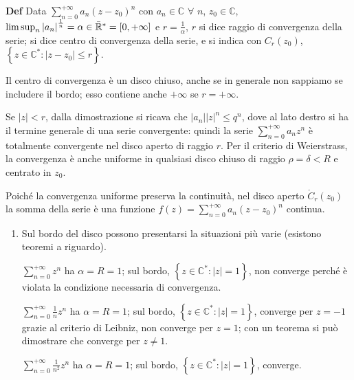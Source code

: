 \documentclass{article}
\begin{document}
\textbf{Def} Data $\sum_{n=0}^{+\infty }a_{n}\left( z-z_{0}\right) ^{n}$ con 
$a_{n}\in 
\mathbb{C}
$ $\forall $ $n$, $z_{0}\in 
\mathbb{C}
$, $\lim \sup_{n}\left\vert a_{n}\right\vert ^{\frac{1}{n}}=\alpha \in \bar{%
\mathbb{R}%
}^{\ast }=\left[ 0,+\infty \right] $ e $r=\frac{1}{\alpha }$, $r$ si dice
raggio di convergenza della serie; si dice centro di convergenza della
serie, e si indica con $C_{r}\left( z_{0}\right) $, $\left\{ z\in 
\mathbb{C}
^{\ast }:\left\vert z-z_{0}\right\vert \leq r\right\} $.

Il centro di convergenza \`{e} un disco chiuso, anche se in generale non
sappiamo se includere il bordo; esso contiene anche $+\infty $ se $r=+\infty 
$.

Se $\left\vert z\right\vert <r$, dalla dimostrazione si ricava che $%
\left\vert a_{n}\right\vert \left\vert z\right\vert ^{n}\leq q^{n}$, dove al
lato destro si ha il termine generale di una serie convergente: quindi la
serie $\sum_{n=0}^{+\infty }a_{n}z^{n}$ \`{e} totalmente convergente nel
disco aperto di raggio $r$. Per il criterio di Weierstrass, la convergenza 
\`{e} anche uniforme in qualsiasi disco chiuso di raggio $\rho =\delta <R$ e
centrato in $z_{0}$.

Poich\'{e} la convergenza uniforme preserva la continuit\`{a}, nel disco
aperto $\mathring{C}_{r}\left( z_{0}\right) $ la somma della serie \`{e} una
funzione $f\left( z\right) =\sum_{n=0}^{+\infty }a_{n}\left( z-z_{0}\right)
^{n}$ continua.

\begin{enumerate}
\item Sul bordo del disco possono presentarsi la situazioni pi\`{u} varie
(esistono teoremi a riguardo).

$\sum_{n=0}^{+\infty }z^{n}$ ha $\alpha =R=1$; sul bordo, $\left\{ z\in 
\mathbb{C}
^{\ast }:\left\vert z\right\vert =1\right\} $, non converge perch\'{e} \`{e}
violata la condizione necessaria di convergenza.

$\sum_{n=0}^{+\infty }\frac{1}{n}z^{n}$ ha $\alpha =R=1$; sul bordo, $%
\left\{ z\in 
\mathbb{C}
^{\ast }:\left\vert z\right\vert =1\right\} $, converge per $z=-1$ grazie al
criterio di Leibniz, non converge per $z=1$; con un teorema si pu\`{o}
dimostrare che converge per $z\neq 1$.

$\sum_{n=0}^{+\infty }\frac{1}{n^{2}}z^{n}$ ha $\alpha =R=1$; sul bordo, $%
\left\{ z\in 
\mathbb{C}
^{\ast }:\left\vert z\right\vert =1\right\} $, converge.
\end{enumerate}
\end{document}
